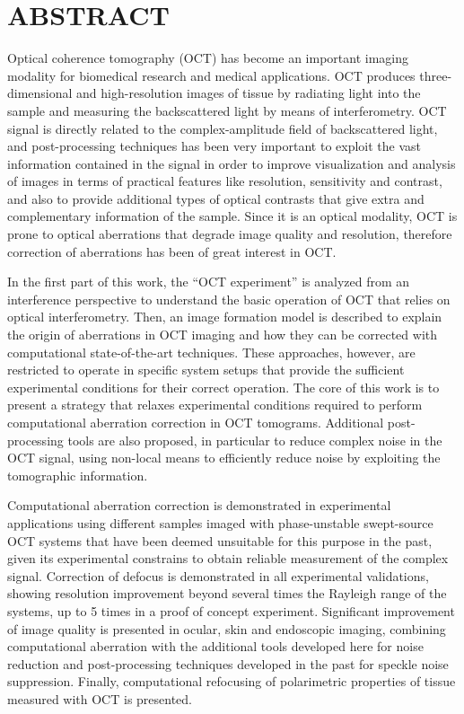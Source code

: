 {}
\chapter*{ABSTRACT}

Optical coherence tomography (OCT) has become an important imaging modality for biomedical research and medical applications. OCT produces three-dimensional and high-resolution images of tissue by radiating light into the sample and measuring the backscattered light by means of interferometry. OCT signal is directly related to the complex-amplitude field of backscattered light, and post-processing techniques has been very important to exploit the vast information contained in the signal in order to improve visualization and analysis of images in terms of practical features like resolution, sensitivity and contrast, and also to provide additional types of optical contrasts that give extra and complementary information of the sample. Since it is an optical modality, OCT is prone to optical aberrations that degrade image quality and resolution, therefore correction of aberrations has been of great interest in OCT.

In the first part of this work, the ``OCT experiment'' is analyzed from an interference perspective to understand the basic operation of OCT that relies on optical interferometry. Then, an image formation model is described to explain the origin of aberrations in OCT imaging and how they can be corrected with computational state-of-the-art techniques. These approaches, however, are restricted to operate in specific system setups that provide the sufficient experimental conditions for their correct operation. The core of this work is to present a strategy that relaxes experimental conditions required to perform computational aberration correction in OCT tomograms. Additional post-processing tools are also proposed, in particular to reduce complex noise in the OCT signal, using non-local means to efficiently reduce noise by exploiting the tomographic information.

Computational aberration correction is demonstrated in experimental applications using different samples imaged with phase-unstable swept-source OCT systems that have been deemed unsuitable for this purpose in the past, given its experimental constrains to obtain reliable measurement of the complex signal. Correction of defocus is demonstrated in all experimental validations, showing resolution improvement beyond several times the Rayleigh range of the systems, up to 5 times in a proof of concept experiment. Significant improvement of image quality is presented in ocular, skin and endoscopic imaging, combining computational aberration with the additional tools developed here for noise reduction and post-processing techniques developed in the past for speckle noise suppression. Finally, computational refocusing of polarimetric properties of tissue measured with OCT is presented.